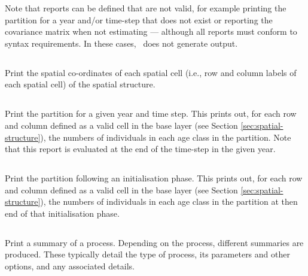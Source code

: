 Note that reports can be defined that are  not valid, for example printing the partition for a year and/or time-step that does not exist or reporting the covariance matrix when not estimating --- although  all reports must conform to syntax requirements. In these cases, \SPM\ does not generate output.

\subsection{}

Print the spatial co-ordinates of each spatial cell (i.e., row and column labels of each spatial cell) of the spatial structure.

\subsection{}

Print the partition for a given year and time step. This prints out, for each row and column defined as a valid cell in the base layer (see Section \ref{sec:spatial-structure}), the numbers of individuals in each age class in the partition. Note that this report is evaluated at the end of the time-step in the given year.

\subsection{}

Print the partition following an initialisation phase. This prints out, for each row and column defined as a valid cell in the base layer (see Section \ref{sec:spatial-structure}), the numbers of individuals in each age class in the partition at then end of that initialisation phase.

\subsection{}

Print a summary of a process. Depending on the process, different summaries are produced. These typically detail the type of process, its parameters and other options, and any associated details.

\subsection{}

